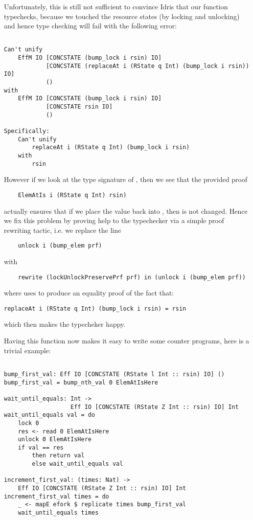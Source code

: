 Unfortunately, this is still not sufficient to convince Idris that our
function typechecks, because we touched the resource states (by locking and
unlocking) and hence type checking will fail with the following error:

\begin{BVerbatim}

Can't unify
    EffM IO [CONCSTATE (bump_lock i rsin) IO]
            [CONCSTATE (replaceAt i (RState q Int) (bump_lock i rsin)) IO]
            ()
with
    EffM IO [CONCSTATE (bump_lock i rsin) IO]
            [CONCSTATE rsin IO]
            ()

Specifically:
    Can't unify
        replaceAt i (RState q Int) (bump_lock i rsin)
    with
        rsin

\end{BVerbatim}


However if we look at the type signature of , then we
see that the provided proof
\begin{Verbatim}
    ElemAtIs i (RState q Int) rsin)
\end{Verbatim}
actually ensures that if we place the value  back into
, then  is not changed. Hence we fix this problem
by proving help to the typechecker via a simple proof rewriting tactic, i.e.
we replace the line
\begin{Verbatim}
    unlock i (bump_elem prf)
\end{Verbatim}
with
\begin{Verbatim}
    rewrite (lockUnlockPreservePrf prf) in (unlock i (bump_elem prf))
\end{Verbatim}
where  uses  to produce an equality proof
of the fact that:
\begin{Verbatim}
replaceAt i (RState q Int) (bump_lock i rsin) = rsin
\end{Verbatim}

which then makes the typecheker happy.

Having this function now makes it easy to write some counter programs, here is
a trivial example:

\begin{BVerbatim}

bump_first_val: Eff IO [CONCSTATE (RState l Int :: rsin) IO] ()
bump_first_val = bump_nth_val 0 ElemAtIsHere

wait_until_equals: Int ->
                   Eff IO [CONCSTATE (RState Z Int :: rsin) IO] Int
wait_until_equals val = do
    lock 0
    res <- read 0 ElemAtIsHere
    unlock 0 ElemAtIsHere
    if val == res
        then return val
        else wait_until_equals val

increment_first_val: (times: Nat) ->
    Eff IO [CONCSTATE (RState Z Int :: rsin) IO] Int
increment_first_val times = do
    _ <- mapE efork $ replicate times bump_first_val
    wait_until_equals times

\end{BVerbatim}


